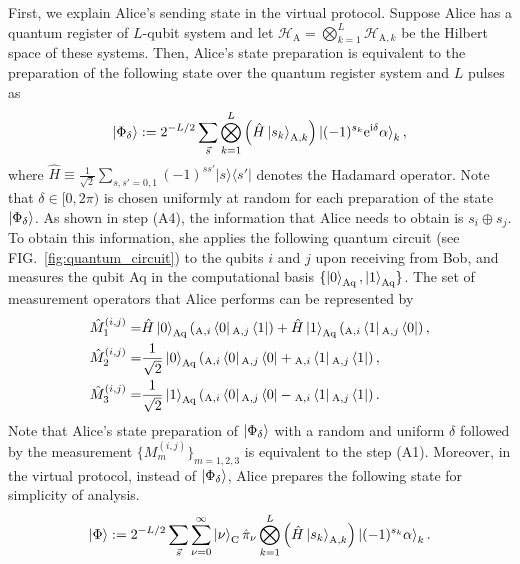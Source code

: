 \documentclass[twocolumn,superscriptaddress,pra,footinbib,notitlepage]{revtex4-1}
\newcommand{\ketbra}[2]{| #1 \rangle \langle #2 |}
\newcommand{\1}{\mbox{1}\hspace{-0.25em}\mbox{l}}
\begin{document}
First, we explain Alice's sending state in the virtual protocol.
Suppose Alice has a quantum register of $L$-qubit system and let $\mathcal{H}_\textrm{A}=\bigotimes_{k=1}^{L}\mathcal{H}_{\textrm{A}, k}$ be the Hilbert space of these systems. Then, Alice's state preparation is equivalent to the preparation of the following state over the quantum register system and $L$ pulses as 
\begin{align}
\ket{\Phi_\delta}:=2^{-L/2}\sum_{\vec{s}}\bigotimes_{k=1}^L\left(\hat{H}\ket{s_k}_{\textrm{A},k}\right)\ket{(-1)^{s_k}\mathrm{e}^{\mathrm{i}\delta}\alpha}_k,\label{defi:alice_prepare_state_entangle}
\end{align}
where $\hat{H}\equiv\frac{1}{\sqrt{2}}\sum_{s, s'=0, 1}(-1)^{ss'}\ketbra{s}{s'} $ denotes the Hadamard operator. Note that $\delta\in[0, 2\pi)$ is chosen uniformly at random for each preparation of the state $\ket{\Phi_\delta}$.
As shown in step (A4), the information that Alice needs to obtain is $s_i\oplus s_j$. 
To obtain this information, she applies the following quantum circuit (see FIG.~\ref{fig:quantum_circuit}) to the qubits $i$ and $j$ upon receiving from Bob, and measures the qubit Aq in the computational basis $\{\ket{0}_\textrm{Aq}, \ket{1}_\textrm{Aq}\}$. The set of measurement operators that Alice performs can be represented by
\begin{align}
\hat{M}_1^{(i, j)}=&\hat{H}\ket{0}_\textrm{Aq}\left({}_{\textrm{A}, i}\bra{0}{}_{\textrm{A}, j}\bra{1}\right)+\hat{H}\ket{1}_\textrm{Aq}\left({}_{\textrm{A}, i}\bra{1}{}_{\textrm{A}, j}\bra{0}\right),\nonumber\\
\hat{M}_2^{(i, j)}=&\frac{1}{\sqrt{2}}\ket{0}_\textrm{Aq}\left({}_{\textrm{A}, i}\bra{0}{}_{\textrm{A}, j}\bra{0}+{}_{\textrm{A}, i}\bra{1}{}_{\textrm{A}, j}\bra{1}\right),\nonumber\\
\hat{M}_3^{(i, j)}=&\frac{1}{\sqrt{2}}\ket{1}_\textrm{Aq}\left({}_{\textrm{A}, i}\bra{0}{}_{\textrm{A}, j}\bra{0}-{}_{\textrm{A}, i}\bra{1}{}_{\textrm{A}, j}\bra{1}\right).
\end{align}
Note that Alice's state preparation of $\ket{\Phi_\delta}$ with a random and uniform $\delta$ followed by the measurement $\{M_{m}^{(i, j)}\}_{m=1,2,3}$ is equivalent to the step (A1).
Moreover, in the virtual protocol, instead of $\ket{\Phi_\delta}$, Alice prepares the following state for simplicity of analysis.
\begin{align}
\ket{\Phi}:=2^{-L/2}\sum_{\vec{s}}\sum_{\nu=0}^\infty\ket{\nu}_\textrm{C}\hat{\pi}_\nu\bigotimes_{k=1}^L\left(\hat{H}\ket{s_k}_{\textrm{A},k}\right)\ket{(-1)^{s_k}\alpha}_k.\label{defi:alice_prepare_state_phase_randomized}
\end{align}
\end{document}
